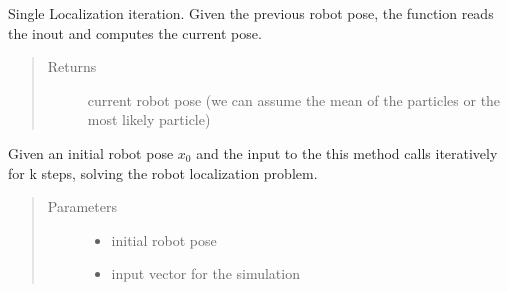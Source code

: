 \documentclass[letterpaper,10pt,english]{sphinxmanual}
\begin{document}
\begin{fulllineitems}
\begin{fulllineitems}
\end{fulllineitems}


\begin{fulllineitems}
\label{\detokenize{particle_filter:MCLocalization.MCLocalization.Localize}}
\sphinxAtStartPar
Single Localization iteration. Given the previous robot pose, the function reads the inout and computes the current pose.
\begin{quote}\begin{description}
\item[{Returns}] \leavevmode
\sphinxAtStartPar
{} current robot pose (we can assume the mean of the particles or the most likely particle)

\end{description}\end{quote}

\end{fulllineitems}


\begin{fulllineitems}
\label{\detokenize{particle_filter:MCLocalization.MCLocalization.LocalizationLoop}}
\sphinxAtStartPar
Given an initial robot pose \(x_0\) and the input to the  this method calls iteratively  for k steps, solving the robot localization problem.
\begin{quote}\begin{description}
\item[{Parameters}] \leavevmode\begin{itemize}
\item {} 
\sphinxAtStartPar
{} \textendash{} initial robot pose

\item {} 
\sphinxAtStartPar
{} \textendash{} input vector for the simulation

\end{itemize}

\end{description}\end{quote}

\end{fulllineitems}


\end{fulllineitems}
\end{document}
